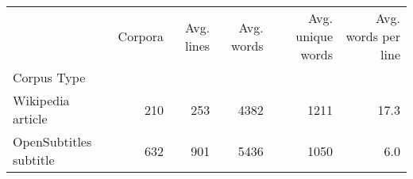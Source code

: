 \begin{tabular}{lrrrrr}
\toprule
 & Corpora & Avg. lines & Avg. words & Avg. unique words & Avg. words per line \\
Corpus Type &  &  &  &  &  \\
\midrule
Wikipedia article & 210 & 253 & 4382 & 1211 & 17.3 \\
OpenSubtitles subtitle & 632 & 901 & 5436 & 1050 & 6.0 \\
\bottomrule
\end{tabular}

